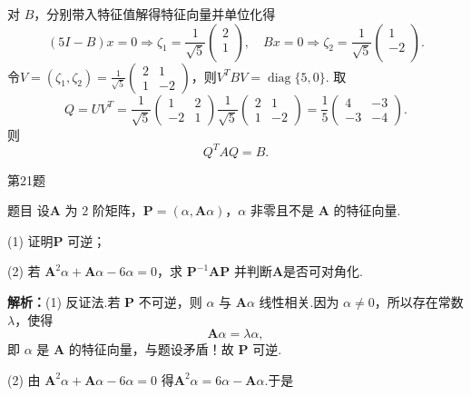 \documentclass[aspectratio=169]{beamer}
\begin{document}
\begin{frame}
对 $B$，分别带入特征值解得特征向量并单位化得
\[
\left( 5I-B \right) x=0\Longrightarrow \zeta _1=\frac{1}{\sqrt{5}}\left( \begin{array}{c}
2\\
1\\
\end{array} \right) ,\quad Bx=0\Longrightarrow \zeta _2=\frac{1}{\sqrt{5}}\left( \begin{array}{c}
1\\
-2\\
\end{array} \right) .
\]
令$V=(\zeta_1,\zeta_2)=\frac1{\sqrt5}\begin{pmatrix}2&1\\1&-2\end{pmatrix}$，则$V^{T}BV=\operatorname{diag}\{5,0\}.$
取
\[
Q=UV^{T}
=\frac1{\sqrt5}\begin{pmatrix}1&2\\-2&1\end{pmatrix}
\frac1{\sqrt5}\begin{pmatrix}2&1\\1&-2\end{pmatrix}
=\frac15\begin{pmatrix}4&-3\\-3&-4\end{pmatrix}.
\]
则
\[
Q^{T}AQ=B.
\]
\end{frame}

\begin{frame}{第21题}
\begin{block}{题目}
设$\bm A$ 为 $2$ 阶矩阵，$\bm P=(\alpha,\bm A\alpha)$，$\alpha$ 非零且不是 $\bm A$ 的特征向量.

(1) 证明$\bm P$ 可逆；

(2) 若 $\bm A^2\alpha+\bm A\alpha-6\alpha=0$，求 $\bm P^{-1}\bm A\bm P$ 并判断$\bm A$是否可对角化.
\end{block}
\textbf{解析：}(1) 反证法.若 $\bm P$ 不可逆，则 $\alpha$ 与 $\bm A\alpha$ 线性相关.因为 $\alpha\neq0$，所以存在常数 $\lambda$，使得
\[
\bm A\alpha=\lambda\alpha,
\]
即 $\alpha$ 是 $\bm A$ 的特征向量，与题设矛盾！故 $\bm P$ 可逆.

(2) 由
$\bm A^2\alpha+\bm A\alpha-6\alpha=0$
得$\bm A^2\alpha=6\alpha-\bm A\alpha.$于是
\end{frame}
\end{document}
